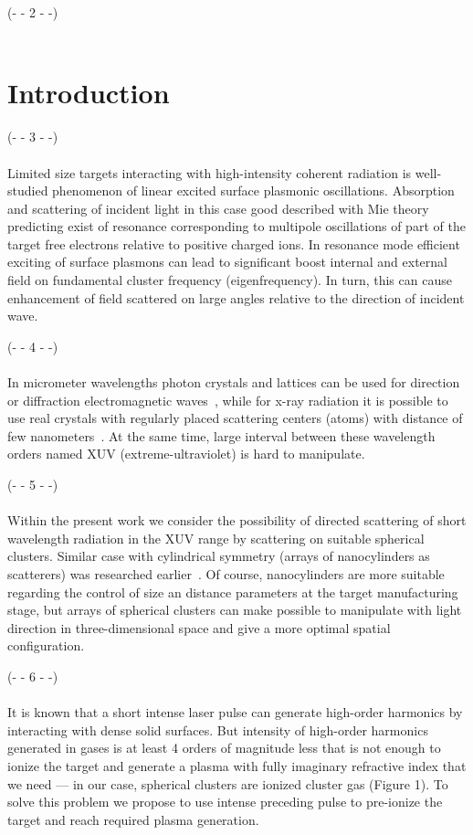\noindent(- - 2 - -)\\~\\

\section{Introduction}

\noindent(- - 3 - -)\\~\\
Limited size targets interacting with high-intensity coherent radiation is well-studied phenomenon of linear excited surface plasmonic oscillations. Absorption and scattering of incident light in this case good described with Mie theory predicting exist of resonance corresponding to multipole oscillations of part of the target free electrons relative to positive charged ions. In resonance mode efficient exciting of surface plasmons can lead to significant boost internal and external field on fundamental cluster frequency (eigenfrequency). In turn, this can cause enhancement of field scattered on large angles relative to the direction of incident wave. 

\noindent(- - 4 - -)\\~\\
In micrometer wavelengths photon crystals and lattices can be used for direction or diffraction electromagnetic waves~\cite{lin_zhang}, while for x-ray radiation it is possible to use real crystals with regularly placed scattering centers (atoms) with distance of few nanometers~\cite{batterman_cole}. At the same time, large interval between these wavelength orders named XUV (extreme-ultraviolet) is hard to manipulate.

\noindent(- - 5 - -)\\~\\
Within the present work we consider the possibility of directed scattering of short wavelength radiation in the XUV range by scattering on suitable spherical clusters. Similar case with cylindrical symmetry (arrays of nanocylinders as scatterers) was researched earlier~\cite{andreev_lecz}. Of course, nanocylinders are more suitable regarding the control of size an distance parameters at the target manufacturing stage, but arrays of spherical clusters can make possible to manipulate with light direction in three-dimensional space and give a more optimal spatial configuration.

\noindent(- - 6 - -)\\~\\
It is known that a short intense laser pulse can generate high-order harmonics by interacting with dense solid surfaces. But intensity of high-order harmonics generated in gases is at least 4 orders of magnitude less that is not enough to ionize the target and generate a plasma with fully imaginary refractive index that we need --- in our case, spherical clusters are ionized cluster gas (Figure 1). To solve this problem we propose to use intense preceding pulse to pre-ionize the target and reach required plasma generation.

